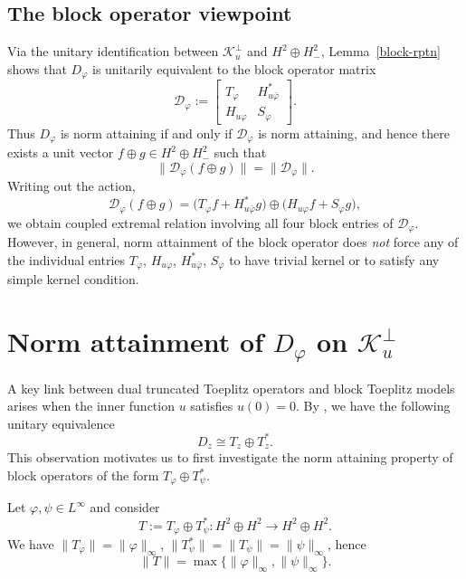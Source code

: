 \documentclass[12pt]{amsart}
\theoremstyle{definition}
\theoremstyle{remark}
\newcommand{\clk}{\mathcal{K}}
\newcommand{\cld}{\mathcal{D}}
\newcommand{\vp}{\varphi}
\numberwithin{equation}{section}
\begin{document}
\subsection{The block operator viewpoint}

Via the unitary identification between $\clk_u^\perp$ and $ H^2 \oplus H^2_{-}$, Lemma~\ref{block-rptn} shows that $D_\vp$ is unitarily equivalent to the block operator matrix
\[
\cld_\vp
:=
\begin{bmatrix}
	T_\vp & H^*_{u\bar{\vp}} \\
	H_{u\vp} & S_\vp
\end{bmatrix}.
\]
Thus $D_\vp$ is norm attaining if and only if $\cld_\vp$ is norm attaining, and hence there exists a unit vector $f\oplus g\in H^2\oplus H^2_{-}$ such that
$$
\|\cld_\vp (f\oplus g)\| = \|\cld_\vp\|.
$$
Writing out the action,
\begin{equation}
\cld_\vp(f\oplus g)
=
\big(T_\vp f + H^*_{u\bar{\vp}}g\big)
\oplus
\big(H_{u\vp}f + S_\vp g\big),
\end{equation}
we obtain coupled extremal relation involving all four block entries of $\cld_\vp$. However, in general, norm attainment of the block operator does \emph{not} force any of the individual entries $T_\vp$, $H_{u\vp}$, $H^*_{u\bar{\vp}}$, $S_\vp$ to have trivial kernel or to satisfy any simple kernel condition. 



\section{Norm attainment of $D_\vp$ on $\clk_u^\perp$}

A key link between dual truncated Toeplitz operators and block Toeplitz models arises when the inner function $u$ satisfies $u(0)=0$. By \cite[Corollary 4.3]{Camara2021}, we have the following unitary equivalence
$$
D_z \cong T_z \oplus T_z^*.
$$
This observation motivates us to first investigate the norm attaining property of block operators of the form $T_\vp \oplus T^*_\psi$.



Let $\vp,\psi\in L^\infty$ and consider
\[
T:=T_\vp\oplus T_\psi^*  :  H^2\oplus H^2 \longrightarrow H^2\oplus H^2.
\]
We have $\|T_\vp\|=\|\vp\|_\infty$, $\|T_\psi^*\|=\|T_\psi\|=\|\psi\|_\infty$, hence
\[
\|T\|=\max\{\|\vp\|_\infty,\|\psi\|_\infty\}.
\]
\end{document}
